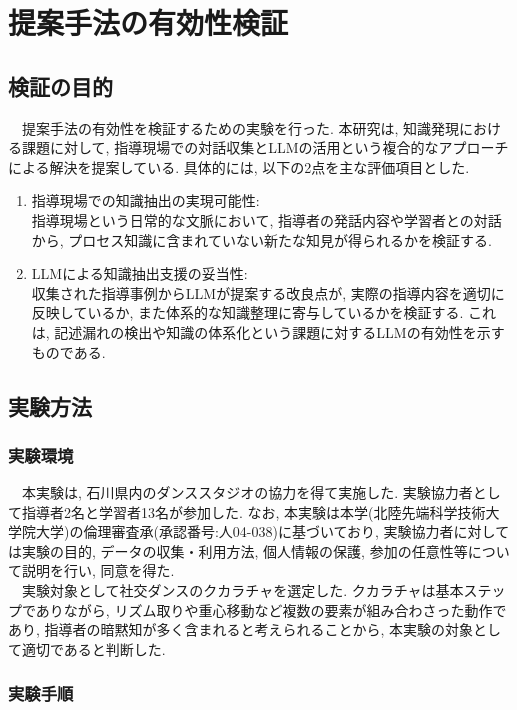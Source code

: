 \chapter{提案手法の有効性検証}

\section{検証の目的}
　提案手法の有効性を検証するための実験を行った. 本研究は, 知識発現\cite{Nishimura2017}における課題に対して, 指導現場での対話収集とLLMの活用という複合的なアプローチによる解決を提案している. 具体的には, 以下の2点を主な評価項目とした.\\
\begin{enumerate}
    \item 指導現場での知識抽出の実現可能性:\\
    指導現場という日常的な文脈において, 指導者の発話内容や学習者との対話から, プロセス知識に含まれていない新たな知見が得られるかを検証する. 
    \item LLMによる知識抽出支援の妥当性:\\
    収集された指導事例からLLMが提案する改良点が, 実際の指導内容を適切に反映しているか, また体系的な知識整理に寄与しているかを検証する. これは, 記述漏れの検出や知識の体系化という課題に対するLLMの有効性を示すものである. 
\end{enumerate}


\section{実験方法}
\subsection{実験環境}
　本実験は, 石川県内のダンススタジオの協力を得て実施した. 実験協力者として指導者2名と学習者13名が参加した. なお, 本実験は本学(北陸先端科学技術大学院大学)の倫理審査承(承認番号:人04-038)に基づいており, 実験協力者に対しては実験の目的, データの収集・利用方法, 個人情報の保護, 参加の任意性等について説明を行い, 同意を得た. \\
　実験対象として社交ダンスのクカラチャを選定した. クカラチャは基本ステップでありながら, リズム取りや重心移動など複数の要素が組み合わさった動作であり, 指導者の暗黙知が多く含まれると考えられることから, 本実験の対象として適切であると判断した. \\


\subsection{実験手順}
